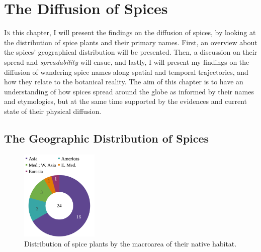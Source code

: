 \chapter{The Diffusion of Spices}
\label{ch:diffusion}





\lettrine[lines=\iniciale]{\textcolor{\accentcolor}{I}}{n} this chapter, I will present the findings on the diffusion of spices, by looking at the distribution of spice plants and their primary names. First, an overview about the spices' geographical distribution will be presented. Then, a discussion on their spread and \textit{spreadability} will ensue, and lastly, I will present my findings on the diffusion of wandering spice names along spatial and temporal trajectories, and how they relate to the botanical reality. The aim of this chapter is to have an understanding of how spices spread around the globe as informed by their names and etymologies, but at the same time supported by the evidences and current state of their physical diffusion.

\section{The Geographic Distribution of Spices}

\begin{figure}
    \vspace{-\baselineskip}
    \includegraphics[width=0.33\textwidth]{imgs/plots/macroarea_pie.pdf}
    \caption[Distribution of spice plants by the macroarea of their native habitat.]{Distribution of spice plants by the macroarea of their native habitat.}
    \label{fig:macroarea_pie}
  \end{figure}
  
